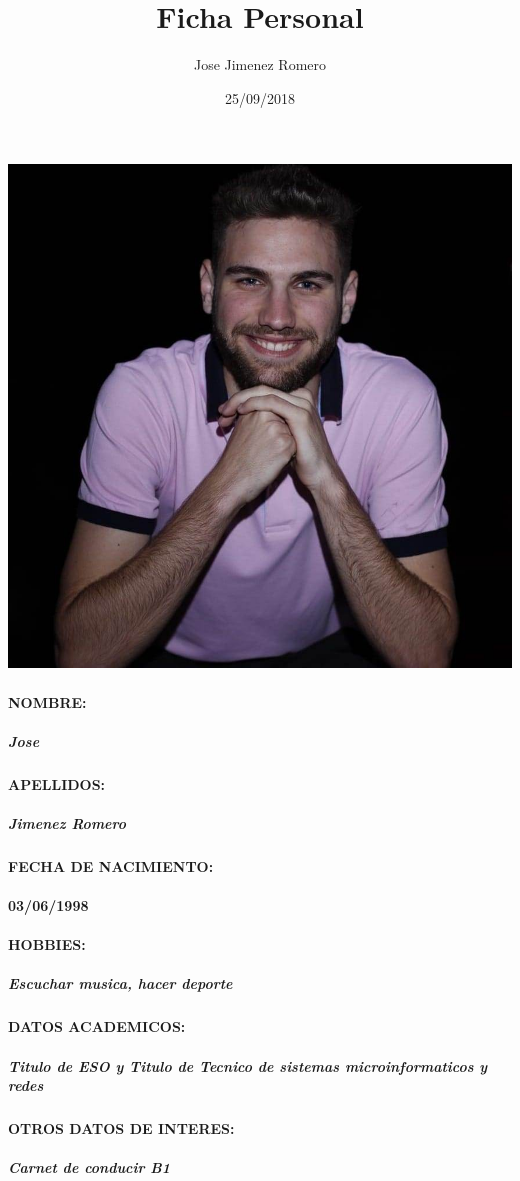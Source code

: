 \documentclass[12pt]{article}
\title{Ficha Personal}
\author{Jose Jimenez Romero}
\date{25/09/2018}
\begin{document}
\maketitle
\includegraphics{50763180b5488f52d4aec43304813d9d192fde0e6ef955a9ea4d05e45fd5e009c67302b4.jpg}

\begin{figure}
  
\end{figure}
\paragraph{NOMBRE:}
\subparagraph{Jose}
\paragraph{APELLIDOS:}
\subparagraph{Jimenez Romero}

\paragraph{FECHA DE NACIMIENTO:}
\paragraph{03/06/1998}



\paragraph{HOBBIES:}
\subparagraph{Escuchar musica, hacer deporte}


\paragraph{DATOS ACADEMICOS:}
\subparagraph{Titulo de ESO y Titulo de Tecnico de sistemas microinformaticos y redes}
\subparagraph{}




\paragraph{OTROS DATOS DE INTERES:}
\subparagraph{Carnet de conducir B1}
\subparagraph{}
\end{document}
